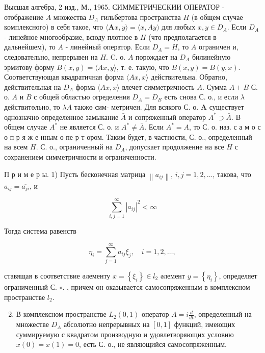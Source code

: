 \documentclass[10pt]{article}
\begin{document}
Высшая алгебра, 2 изд., М., 1965. СИММЕТРИЧЕСКИИ ОПЕРАТОР - отображение $A$ множества $D_{A}$ гильбертова пространства $H$ (в общем случае комплексного) в себя такое, что $\langle\boldsymbol{A} x, y\rangle=\langle x, A y)$ для любых $x, y \in D_{A}$. Если $D_{A}$ - линейное многообразие, всюду плотное в $H$ (что предполагается в дальнейшем), то $A$ - линейный оператор. Если $D_{A}=H$, то $A$ ограничен и, следовательно, непрерывен на $H$. C. о. $A$ порождает на $D_{A}$ билинейную эрмитову форму $B(x, y)=\langle A x, y\rangle$, т. е. такую, что $B(x, y)=\overline{B(y, x)}$. Соответствующая квадратичная форма $\langle A x, x\rangle$ действительна. Обратно, действительная на $D_{A}$ форма $\langle A x, x\rangle$ влечет симметричность $A$. Сумма $A+B$ С. о. $A$ и $B$ с общей областью огределения $D_{A}=D_{B}$ есть снова С. о., и если $\lambda$ действитөльно, то $\lambda A$ такжө сим- метричен. Для всякого С. о. $\boldsymbol{A}$ существует однозначно определенное замыкание $\bar{A}$ и сопряженный оператор $A^{*} \supset \bar{A}$. В общем случае $A^{*}$ не является С. о. и $A^{*} \neq \bar{A}$. Если $A^{*}=A$, то С. о. наз. с а м о с о п р я ж е нным о пе р т ором. Таким будет, в частности, С. о., определенный на всем $H$. С. о., ограниченный на $D_{A}$, допускает продолжение на все $H$ с сохранением симметричности и ограниченности.



П р и м е р ы. 1) Пусть бесконечная матрица $\left\|a_{i j}\right\|$, $i, j=1,2, \ldots$, такова, что $a_{i j}=\overline{a_{j i}}$, и



\[

\sum_{i, j=1}^{\infty}\left|a_{i j}\right|^{2}<\infty

\]



Тогда система равенств



\[

\eta_{i}=\sum_{j=1}^{\infty} a_{i j} \xi_{j}, \quad i=1,2, \ldots,

\]



ставящая в соответствие әлементу $x=\left\{\xi_{i}\right\} \in l_{2}$ әлемент $y=\left\{\eta_{i}\right\}$, определяет ограниченный С. $\circ$. , причем он оказывается самосопряженным в комплексном пространстве $l_{2}$.



\begin{enumerate}

  \setcounter{enumi}{1}

  \item В комплексном пространстве $L_{2}(0,1)$ оператор $A=i \frac{d}{d t}$, определенный на множестве $D_{A}$ абсолютно непрерывных на $[0,1]$ функций, имеющих суммируемую с квадратом производную и удовлетворяющих условию $x(0)=x(1)=0$, есть С. о., не являющийся самосопряженным.

\end{enumerate}
\end{document}
